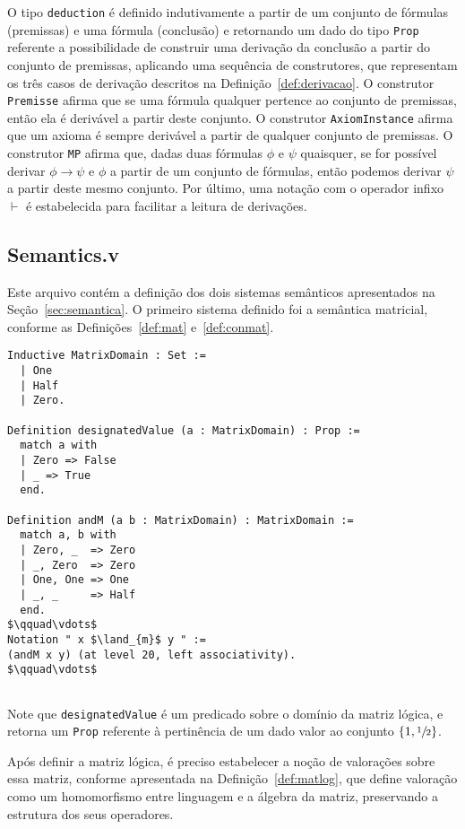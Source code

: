       O tipo \texttt{deduction} é definido indutivamente a partir de um conjunto de fórmulas (premissas) e uma fórmula (conclusão) e retornando um dado do tipo \texttt{Prop} referente a possibilidade de construir uma derivação da conclusão a partir do conjunto de premissas, aplicando uma sequência de construtores, que representam os três casos de derivação descritos na Definição~\ref{def:derivacao}. O construtor \texttt{Premisse} afirma que se uma fórmula qualquer pertence ao conjunto de premissas, então ela é derivável a partir deste conjunto. O construtor \texttt{AxiomInstance} afirma que um axioma é sempre derivável a partir de qualquer conjunto de premissas. O construtor \texttt{MP} afirma que, dadas duas fórmulas $\phi$ e $\psi$ quaisquer, se for possível derivar $\phi \to \psi$ e $\phi$ a partir de um conjunto de fórmulas, então podemos derivar $\psi$ a partir deste mesmo conjunto. Por último, uma notação com o operador infixo $\vdash$ é estabelecida para facilitar a leitura de derivações.
    
    \subsection{Semantics.v}

      Este arquivo contém a definição dos dois sistemas semânticos apresentados na Seção~\ref{sec:semantica}. O primeiro sistema definido foi a semântica matricial, conforme as Definições~\ref{def:mat} e~\ref{def:conmat}.
      \begin{lstlisting}[name=Semantics, frame=single, language=coq]
Inductive MatrixDomain : Set :=
  | One
  | Half
  | Zero.

Definition designatedValue (a : MatrixDomain) : Prop :=
  match a with
  | Zero => False
  | _ => True
  end.

Definition andM (a b : MatrixDomain) : MatrixDomain :=
  match a, b with
  | Zero, _  => Zero
  | _, Zero  => Zero
  | One, One => One
  | _, _     => Half
  end.
$\qquad\vdots$
Notation " x $\land_{m}$ y " := 
(andM x y) (at level 20, left associativity).
$\qquad\vdots$
        
      \end{lstlisting}
      Note que \texttt{designatedValue} é um predicado sobre o domínio da matriz lógica, e retorna um \texttt{Prop} referente à pertinência de um dado valor ao conjunto $\{1,\sfrac{1}{2}{}\}$.

      Após definir a matriz lógica, é preciso estabelecer a noção de valorações sobre essa matriz, conforme apresentada na Definição~\ref{def:matlog}, que define valoração como um homomorfismo entre linguagem e a álgebra da matriz, preservando a estrutura dos seus operadores.
    
